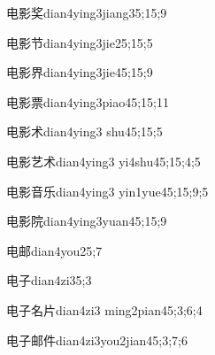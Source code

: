 \begin{verbete}{电影奖}{dian4ying3jiang3}{5;15;9}
\end{verbete}

\begin{verbete}{电影节}{dian4ying3jie2}{5;15;5}
\end{verbete}

\begin{verbete}{电影界}{dian4ying3jie4}{5;15;9}
\end{verbete}

\begin{verbete}{电影票}{dian4ying3piao4}{5;15;11}
\end{verbete}

\begin{verbete}{电影术}{dian4ying3 shu4}{5;15;5}
\end{verbete}

\begin{verbete}{电影艺术}{dian4ying3 yi4shu4}{5;15;4;5}
\end{verbete}

\begin{verbete}{电影音乐}{dian4ying3 yin1yue4}{5;15;9;5}
\end{verbete}

\begin{verbete}{电影院}{dian4ying3yuan4}{5;15;9}
\end{verbete}

\begin{verbete}{电邮}{dian4you2}{5;7}
\end{verbete}

\begin{verbete}{电子}{dian4zi3}{5;3}
\end{verbete}

\begin{verbete}{电子名片}{dian4zi3 ming2pian4}{5;3;6;4}
\end{verbete}

\begin{verbete}{电子邮件}{dian4zi3you2jian4}{5;3;7;6}
\end{verbete}

